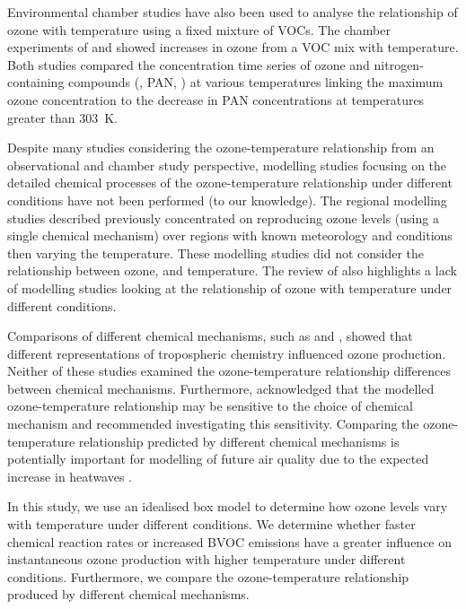 Environmental chamber studies have also been used to analyse the relationship of ozone with temperature using a fixed mixture of VOCs.
The chamber experiments of \citet{Carter:1979} and \citet{Hatakeyama:1991} showed increases in ozone from a VOC mix with temperature.
Both studies compared the concentration time series of ozone and nitrogen-containing compounds (, PAN, ) at various temperatures linking the maximum ozone concentration to the decrease in PAN concentrations at temperatures greater than $303$~K.

Despite many studies considering the ozone-temperature relationship from an observational and chamber study perspective, modelling studies focusing on the detailed chemical processes of the ozone-temperature relationship under different  conditions have not been performed (to our knowledge).
The regional modelling studies described previously concentrated on reproducing ozone levels (using a single chemical mechanism) over regions with known meteorology and  conditions then varying the temperature.
These modelling studies did not consider the relationship between ozone,  and temperature.
The review of \citet{Pusede:2015} also highlights a lack of modelling studies looking at the relationship of ozone with temperature under different  conditions.

Comparisons of different chemical mechanisms, such as \citet{Emmerson:2009} and \citet{Coates:2015}, showed that different representations of tropospheric chemistry influenced ozone production.
Neither of these studies examined the ozone-temperature relationship differences between chemical mechanisms.
Furthermore, \citet{Rasmussen:2013} acknowledged that the modelled ozone-temperature relationship may be sensitive to the choice of chemical mechanism and recommended investigating this sensitivity.
Comparing the ozone-temperature relationship predicted by different chemical mechanisms is potentially important for modelling of future air quality due to the expected increase in heatwaves \citep{Karl:2003}.

In this study, we use an idealised box model to determine how ozone levels vary with temperature under different  conditions.
We determine whether faster chemical reaction rates or increased BVOC emissions have a greater influence on instantaneous ozone production with higher temperature under different  conditions.
Furthermore, we compare the ozone-temperature relationship produced by different chemical mechanisms.
